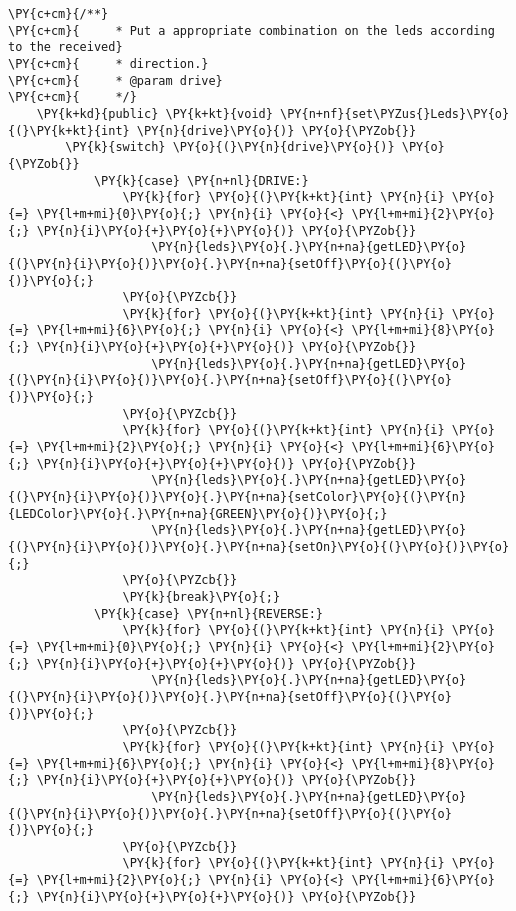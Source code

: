 \begin{Verbatim}[commandchars=\\\{\}]
    \PY{c+cm}{/**}
\PY{c+cm}{     * Put a appropriate combination on the leds according to the received}
\PY{c+cm}{     * direction.}
\PY{c+cm}{     * @param drive}
\PY{c+cm}{     */}
    \PY{k+kd}{public} \PY{k+kt}{void} \PY{n+nf}{set\PYZus{}Leds}\PY{o}{(}\PY{k+kt}{int} \PY{n}{drive}\PY{o}{)} \PY{o}{\PYZob{}}
        \PY{k}{switch} \PY{o}{(}\PY{n}{drive}\PY{o}{)} \PY{o}{\PYZob{}}
            \PY{k}{case} \PY{n+nl}{DRIVE:}
                \PY{k}{for} \PY{o}{(}\PY{k+kt}{int} \PY{n}{i} \PY{o}{=} \PY{l+m+mi}{0}\PY{o}{;} \PY{n}{i} \PY{o}{<} \PY{l+m+mi}{2}\PY{o}{;} \PY{n}{i}\PY{o}{+}\PY{o}{+}\PY{o}{)} \PY{o}{\PYZob{}}
                    \PY{n}{leds}\PY{o}{.}\PY{n+na}{getLED}\PY{o}{(}\PY{n}{i}\PY{o}{)}\PY{o}{.}\PY{n+na}{setOff}\PY{o}{(}\PY{o}{)}\PY{o}{;}
                \PY{o}{\PYZcb{}}
                \PY{k}{for} \PY{o}{(}\PY{k+kt}{int} \PY{n}{i} \PY{o}{=} \PY{l+m+mi}{6}\PY{o}{;} \PY{n}{i} \PY{o}{<} \PY{l+m+mi}{8}\PY{o}{;} \PY{n}{i}\PY{o}{+}\PY{o}{+}\PY{o}{)} \PY{o}{\PYZob{}}
                    \PY{n}{leds}\PY{o}{.}\PY{n+na}{getLED}\PY{o}{(}\PY{n}{i}\PY{o}{)}\PY{o}{.}\PY{n+na}{setOff}\PY{o}{(}\PY{o}{)}\PY{o}{;}
                \PY{o}{\PYZcb{}}
                \PY{k}{for} \PY{o}{(}\PY{k+kt}{int} \PY{n}{i} \PY{o}{=} \PY{l+m+mi}{2}\PY{o}{;} \PY{n}{i} \PY{o}{<} \PY{l+m+mi}{6}\PY{o}{;} \PY{n}{i}\PY{o}{+}\PY{o}{+}\PY{o}{)} \PY{o}{\PYZob{}}
                    \PY{n}{leds}\PY{o}{.}\PY{n+na}{getLED}\PY{o}{(}\PY{n}{i}\PY{o}{)}\PY{o}{.}\PY{n+na}{setColor}\PY{o}{(}\PY{n}{LEDColor}\PY{o}{.}\PY{n+na}{GREEN}\PY{o}{)}\PY{o}{;}
                    \PY{n}{leds}\PY{o}{.}\PY{n+na}{getLED}\PY{o}{(}\PY{n}{i}\PY{o}{)}\PY{o}{.}\PY{n+na}{setOn}\PY{o}{(}\PY{o}{)}\PY{o}{;}
                \PY{o}{\PYZcb{}}
                \PY{k}{break}\PY{o}{;}
            \PY{k}{case} \PY{n+nl}{REVERSE:}
                \PY{k}{for} \PY{o}{(}\PY{k+kt}{int} \PY{n}{i} \PY{o}{=} \PY{l+m+mi}{0}\PY{o}{;} \PY{n}{i} \PY{o}{<} \PY{l+m+mi}{2}\PY{o}{;} \PY{n}{i}\PY{o}{+}\PY{o}{+}\PY{o}{)} \PY{o}{\PYZob{}}
                    \PY{n}{leds}\PY{o}{.}\PY{n+na}{getLED}\PY{o}{(}\PY{n}{i}\PY{o}{)}\PY{o}{.}\PY{n+na}{setOff}\PY{o}{(}\PY{o}{)}\PY{o}{;}
                \PY{o}{\PYZcb{}}
                \PY{k}{for} \PY{o}{(}\PY{k+kt}{int} \PY{n}{i} \PY{o}{=} \PY{l+m+mi}{6}\PY{o}{;} \PY{n}{i} \PY{o}{<} \PY{l+m+mi}{8}\PY{o}{;} \PY{n}{i}\PY{o}{+}\PY{o}{+}\PY{o}{)} \PY{o}{\PYZob{}}
                    \PY{n}{leds}\PY{o}{.}\PY{n+na}{getLED}\PY{o}{(}\PY{n}{i}\PY{o}{)}\PY{o}{.}\PY{n+na}{setOff}\PY{o}{(}\PY{o}{)}\PY{o}{;}
                \PY{o}{\PYZcb{}}
                \PY{k}{for} \PY{o}{(}\PY{k+kt}{int} \PY{n}{i} \PY{o}{=} \PY{l+m+mi}{2}\PY{o}{;} \PY{n}{i} \PY{o}{<} \PY{l+m+mi}{6}\PY{o}{;} \PY{n}{i}\PY{o}{+}\PY{o}{+}\PY{o}{)} \PY{o}{\PYZob{}}

\end{Verbatim}
